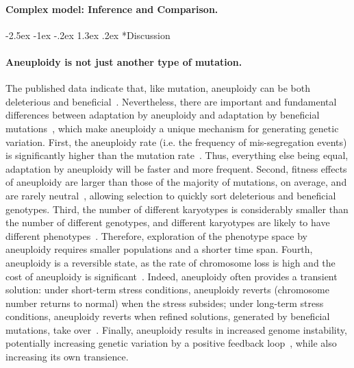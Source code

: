 \documentclass[12pt]{extarticle}
\makeatletter
\renewcommand\section{\@startsection {section}{1}{\z@}%
     {-2.5ex \@plus -1ex \@minus -.2ex}%
     {1.3ex \@plus.2ex}%
    {\Large\bfseries}}
\makeatother
\begin{document}
\paragraph{Complex model: Inference and Comparison.}


\pagebreak
\section*{Discussion}

\paragraph*{Aneuploidy is not just another type of mutation.}
The published data indicate that, like mutation, aneuploidy can be both deleterious and beneficial~\citep{Pavelka2010, Sheltzer2011}.
Nevertheless, there are important and fundamental differences between adaptation by aneuploidy
and adaptation by beneficial mutations~\citep{Yona2015}, which make aneuploidy a unique mechanism for generating genetic
variation.
First, the aneuploidy rate (i.e. the frequency of mis-segregation events) is significantly higher than the
mutation rate~\citep{Santaguida2015review}.
Thus, everything else being equal, adaptation by aneuploidy will be faster and more frequent.
Second, fitness effects of aneuploidy are larger than those of the majority of mutations, on average, and are rarely
neutral~\citep{Pavelka2010, Yona2012, Sunshine2015}, allowing selection to quickly sort deleterious and beneficial genotypes.
Third, the number of different karyotypes is considerably smaller than the number of different genotypes, and different karyotypes are likely to have different phenotypes~\citep{Pavelka2010}.
Therefore, exploration of the phenotype space by aneuploidy requires smaller populations and a shorter time span.
Fourth, aneuploidy is a reversible state, as the rate of chromosome loss is high and the cost of aneuploidy is significant~\citep{Niwa2006}.
Indeed, aneuploidy often provides a transient solution: under short-term stress conditions, aneuploidy reverts (chromosome number returns to normal) when the stress subsides; under long-term stress conditions, aneuploidy reverts when refined solutions, generated by beneficial mutations, take over~\citep{Yona2012}.
Finally, aneuploidy results in increased genome instability, potentially increasing genetic variation by a positive feedback loop~\citep{Rancati2013, Bouchonville2009, Zhu2012}, while also increasing its own transience.
\end{document}
